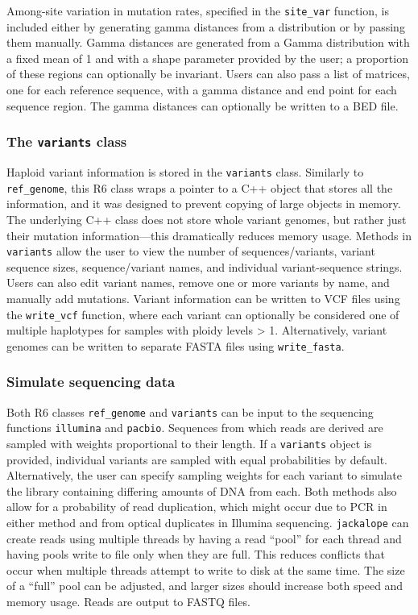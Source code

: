 \documentclass[12pt,]{article}
\begin{document}
Among-site variation in mutation rates, specified in the \texttt{site\_var} function,
is included either by generating gamma distances from a distribution
or by passing them manually.
Gamma distances are generated from a Gamma distribution with a fixed mean of 1
and with a shape parameter provided by the user;
a proportion of these regions can optionally be invariant.
Users can also pass a list of matrices, one for each reference sequence,
with a gamma distance and end point for each sequence region.
The gamma distances can optionally be written to a BED file.

\hypertarget{the-variants-class}{%
\subsubsection{\texorpdfstring{The \texttt{variants} class}{The variants class}}\label{the-variants-class}}

Haploid variant information is stored in the \texttt{variants} class.
Similarly to \texttt{ref\_genome}, this R6 class wraps a pointer to a C++ object
that stores all the information, and it was designed to prevent copying of large
objects in memory.
The underlying C++ class does not store whole variant genomes, but
rather just their mutation information---this dramatically reduces memory usage.
Methods in \texttt{variants} allow the user to view the number of sequences/variants,
variant sequence sizes, sequence/variant names, and individual variant-sequence strings.
Users can also edit variant names, remove one or more variants by name,
and manually add mutations.
Variant information can be written to VCF files using the \texttt{write\_vcf} function,
where each variant can optionally be considered one of multiple haplotypes for
samples with ploidy levels \textgreater{} 1.
Alternatively, variant genomes can be written to separate FASTA files
using \texttt{write\_fasta}.

\hypertarget{simulate-sequencing-data}{%
\subsubsection{Simulate sequencing data}\label{simulate-sequencing-data}}

Both R6 classes \texttt{ref\_genome} and \texttt{variants} can be input to the sequencing functions
\texttt{illumina} and \texttt{pacbio}.
Sequences from which reads are derived are sampled with weights proportional to
their length.
If a \texttt{variants} object is provided, individual variants are sampled with equal
probabilities by default.
Alternatively, the user can specify sampling weights for each variant
to simulate the library containing differing amounts of DNA from each.
Both methods also allow for a probability of read duplication, which might occur
due to PCR in either method and from optical duplicates in Illumina sequencing.
\texttt{jackalope} can create reads using multiple threads by having a read ``pool'' for
each thread and having pools write to file only when they are full.
This reduces conflicts that occur when multiple threads attempt to write to disk
at the same time.
The size of a ``full'' pool can be adjusted, and larger sizes should increase both
speed and memory usage.
Reads are output to FASTQ files.
\end{document}
